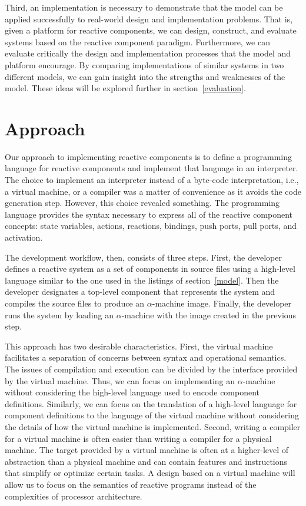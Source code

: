 Third, an implementation is necessary to demonstrate that the model can be applied successfully to real-world design and implementation problems.
That is, given a platform for reactive components, we can design, construct, and evaluate systems based on the reactive component paradigm.
Furthermore, we can evaluate critically the design and implementation processes that the model and platform encourage.
By comparing implementations of similar systems in two different models, we can gain insight into the strengths and weaknesses of the model.
These ideas will be explored further in section~\ref{evaluation}.

\section{Approach}
Our approach to implementing reactive components is to define a programming language for reactive components and implement that language in an interpreter.
The choice to implement an interpreter instead of a byte-code interpretation, i.e., a virtual machine, or a compiler was a matter of convenience as it avoids the code generation step.
However, this choice revealed something.
The programming language provides the syntax necessary to express all of the reactive component concepts:  state variables, actions, reactions, bindings, push ports, pull ports, and activation.

The development workflow, then, consists of three steps.
First, the developer defines a reactive system as a set of components in source files using a high-level language similar to the one used in the listings of section~\ref{model}.
Then the developer designates a top-level component that represents the system and compiles the source files to produce an $\alpha$-machine image.
Finally, the developer runs the system by loading an $\alpha$-machine with the image created in the previous step.

This approach has two desirable characteristics.
First, the virtual machine facilitates a separation of concerns between syntax and operational semantics.
The issues of compilation and execution can be divided by the interface provided by the virtual machine.
Thus, we can focus on implementing an $\alpha$-machine without considering the high-level language used to encode component definitions.
Similarly, we can focus on the translation of a high-level language for component definitions to the language of the virtual machine without considering the details of how the virtual machine is implemented.
Second, writing a compiler for a virtual machine is often easier than writing a compiler for a physical machine.
The target provided by a virtual machine is often at a higher-level of abstraction than a physical machine and can contain features and instructions that simplify or optimize certain tasks.
A design based on a virtual machine will allow us to focus on the semantics of reactive programs instead of the complexities of processor architecture.

